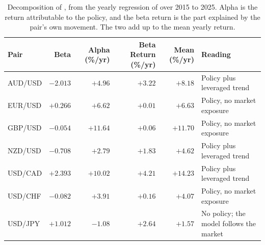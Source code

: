 \begin{table}[htb!]
\centering
\footnotesize
\caption{Decomposition of , from the yearly regression of  over 2015 to 2025. Alpha is the return attributable to the policy, and the beta return is the part explained by the pair's own movement. The two add up to the mean yearly return.}
\label{Tables:AlphaBeta}
\begin{tabular}{@{}lrrrrl@{}}
\toprule
\textbf{Pair} & \textbf{Beta} & \textbf{Alpha (\%/yr)} & \textbf{Beta Return (\%/yr)} & \textbf{Mean (\%/yr)} & \textbf{Reading} \\
\midrule
AUD/USD & $-2.013$ & $+4.96$ & $+3.22$ & $+8.18$ & Policy plus leveraged trend \\
EUR/USD & $+0.266$ & $+6.62$ & $+0.01$ & $+6.63$ & Policy, no market exposure \\
GBP/USD & $-0.054$ & $+11.64$ & $+0.06$ & $+11.70$ & Policy, no market exposure \\
NZD/USD & $-0.708$ & $+2.79$ & $+1.83$ & $+4.62$ & Policy plus leveraged trend \\
USD/CAD & $+2.393$ & $+10.02$ & $+4.21$ & $+14.23$ & Policy plus leveraged trend \\
USD/CHF & $-0.082$ & $+3.91$ & $+0.16$ & $+4.07$ & Policy, no market exposure \\
USD/JPY & $+1.012$ & $-1.08$ & $+2.64$ & $+1.57$ & No policy; the model follows the market \\
\bottomrule
\end{tabular}
\end{table}